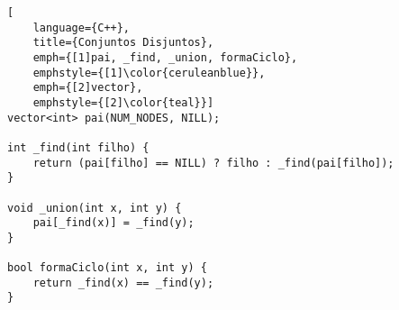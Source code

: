 \begin{lstlisting}[
    language={C++}, 
    title={Conjuntos Disjuntos}, 
    emph={[1]pai, _find, _union, formaCiclo},
    emphstyle={[1]\color{ceruleanblue}},
    emph={[2]vector},
    emphstyle={[2]\color{teal}}]
vector<int> pai(NUM_NODES, NILL);

int _find(int filho) { 
    return (pai[filho] == NILL) ? filho : _find(pai[filho]); 
}
 
void _union(int x, int y) { 
    pai[_find(x)] = _find(y); 
}

bool formaCiclo(int x, int y) { 
    return _find(x) == _find(y);
}
\end{lstlisting}